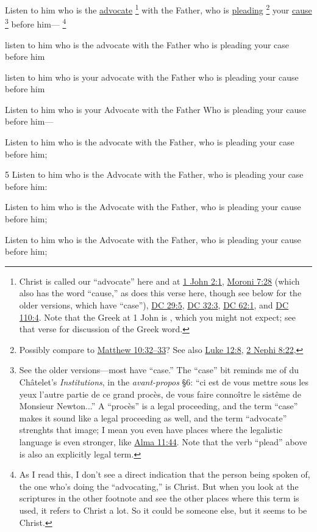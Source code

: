 		Listen to him who is the \hyperref[ADVOCATE]{advocate}%
			\footnote{%
				\label{DC45-3-advocate}%
				Christ is called our ``advocate'' here and at \hyperref[1JOHN-2-1]{1 John 2:1}, \hyperref[MORONI-7-28]{Moroni 7:28} (which also has the word ``cause,'' as does this verse here, though see below for the older versions, which have ``case''), \hyperref[DC29-5]{DC 29:5}, \hyperref[DC32-3]{DC 32:3}, \hyperref[DC62-1]{DC 62:1}, and \hyperref[DC110-4]{DC 110:4}. Note that the Greek at 1 John is , which you might not expect; see that verse for discussion of the Greek word.
				}
		with the Father, who is \hyperref[PLEAD]{pleading}%
			\footnote{%
				Possibly compare to \hyperref[MATTHEW-10-32]{Matthew 10:32--33}? See also \hyperref[LUKE-12-8]{Luke 12:8}, \hyperref[2NEPHI-8-22]{2 Nephi 8:22}, 
				}
		your \hyperref[CAUSE]{cause}%
			\footnote{%
				See the older versions---most have ``case.'' The ``case'' bit reminds me of du Châtelet's \textit{Institutions}, in the \textit{avant-propos} \S6: ``ci est de vous mettre sous les yeux l'autre partie de ce grand procès, de vous faire connoître le sistême de Monsieur Newton...'' A ``procès'' is a legal proceeding, and the term ``case'' makes it sound like a legal proceeding as well, and the term ``advocate'' strenghts that image; I mean you even have places where the legalistic language is even stronger, like \hyperref[ALMA-11-44]{Alma 11:44}. Note that the verb ``plead'' above is also an explicitly legal term.
				}
		before him---%
			\footnote{%
				As I read this, I don't see a direct indication that the person being spoken of, the one who's doing the ``advocating,'' is Christ. But when you look at the scriptures in the other footnote and see the other places where this term is used, it refers to Christ a lot. So it could be someone else, but it seems to be Christ.
				}
		 
		\begin{framed}
		\scriptsize
			\begin{compactdesc}
				\item[JSP] listen to him who is the advocate with the Father who is pleading your case before him
				\item[Partridge] listen to him who is your advocate with the Father who is pleading your cause before him
				\item[McLellin] Listen to him who is your Advocate with the Father Who is pleading your cause before him---
				\item[EMS] Listen to him who is the advocate with the Father, who is pleading your case before him;
				\item[BC] 5 Listen to him who is the Advocate with the Father, who is pleading your case before him:
				\item[DC 1835] Listen to him who is the Advocate with the Father, who is pleading your cause before him;
				\item[DC 1844] Listen to him who is the Advocate with the Father, who is pleading your cause before him;
			\end{compactdesc}
		\end{framed}
		

